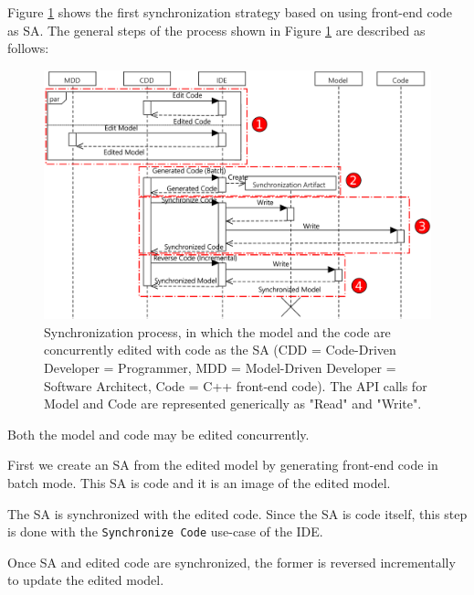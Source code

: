 Figure \ref{fig:scenario3} shows the first synchronization
strategy based on using front-end code as SA.
The general steps of the process shown in Figure \ref{fig:scenario3} are described as follows:

\begin{figure}
	\centering
	\includegraphics[width = \columnwidth]{figures/scenario3_seq}
	\caption{Synchronization process, in which the model and the code are concurrently edited with code as the SA (CDD = Code-Driven Developer = Programmer, MDD = Model-Driven Developer = Software Architect, Code = C++ front-end code). The API calls for Model and Code are represented generically as "Read" and "Write".}
	\label{fig:scenario3}
\end{figure}

\begin{description}[\footnotesize]
	\item[Step 1] Both the model and code may be edited concurrently.
	\item[Step 2] First we create an SA from the edited model by generating front-end code in batch mode.
	This SA is code and it is an image of the edited model.	
	
	\item[Step 3] The SA is synchronized with the edited code. Since the SA
	is code itself, this step is done with the \texttt{Synchronize Code} use-case of the IDE.
	
	\item[Step 4] Once SA and edited code are synchronized, the former is reversed incrementally to update the edited model.
\end{description}

